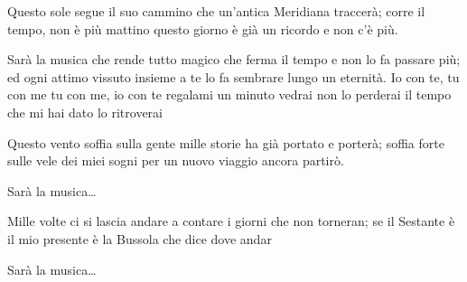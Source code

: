 
\beginverse

Questo sole segue il suo cammino
che un'antica Meridiana traccerà;
corre il tempo, non è più mattino
questo giorno è già un ricordo e non c'è più.

\endverse

\beginchorus

Sarà la musica 
che rende tutto magico
che ferma il tempo 
e non lo fa passare più;
ed ogni attimo vissuto insieme a te
lo fa sembrare lungo un eternità.
Io con te, tu con me
tu con me, io con te
regalami un minuto
vedrai non lo perderai
il tempo che mi hai dato
lo ritroverai 

\endchorus

\chordsoff

\beginverse

Questo vento soffia sulla gente
mille storie ha già portato e porterà;
soffia forte sulle vele dei miei sogni
per un nuovo viaggio ancora partirò.

\endverse

\beginchorus

Sarà la musica\dots

\endchorus

\beginverse

Mille volte ci si lascia andare
a contare i giorni che non torneran;
se il Sestante è il mio presente
è la Bussola che dice dove andar

\endverse

\beginchorus

Sarà la musica\dots

\endchorus

\endsong